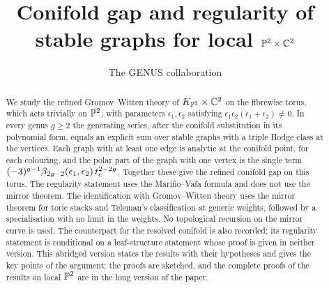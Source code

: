 \documentclass[11pt, reqno]{amsart}
\title[Conifold gap for local $\bbP^2\times\bbC^2$ (abridged version)]{Conifold gap and regularity of stable graphs for local \texorpdfstring{$\bbP^2\times\bbC^2$}{P2 x C2}}
\author{The GENUS collaboration}
\begin{document}
\begin{abstract}
We study the refined Gromov--Witten theory of $K_{\mathbb{P}^2}\times\mathbb{C}^2$ on the fibrewise torus, which acts trivially on $\mathbb{P}^2$, with parameters $\epsilon_1,\epsilon_2$ satisfying $\epsilon_1\epsilon_2(\epsilon_1+\epsilon_2)\neq 0$. In every genus $g\geq 2$ the generating series, after the conifold substitution in its polynomial form, equals an explicit sum over stable graphs with a triple Hodge class at the vertices. Each graph with at least one edge is analytic at the conifold point, for each colouring, and the polar part of the graph with one vertex is the single term $(-3)^{g-1}\beta_{2g-2}(\epsilon_1,\epsilon_2)\,t_{\mathrm{c}}^{2-2g}$. Together these give the refined conifold gap on this torus. The regularity statement uses the Mari\~no--Vafa formula and does not use the mirror theorem. The identification with Gromov--Witten theory uses the mirror theorem for toric stacks and Teleman's classification at generic weights, followed by a specialisation with no limit in the weights. No topological recursion on the mirror curve is used. The counterpart for the resolved conifold is also recorded; its regularity statement is conditional on a leaf-structure statement whose proof is given in neither version. This abridged version states the results with their hypotheses and gives the key points of the argument; the proofs are sketched, and the complete proofs of the results on local $\mathbb{P}^2$ are in the long version of the paper.
\end{abstract}

\maketitle
\genusdisclaimer

















\end{document}
